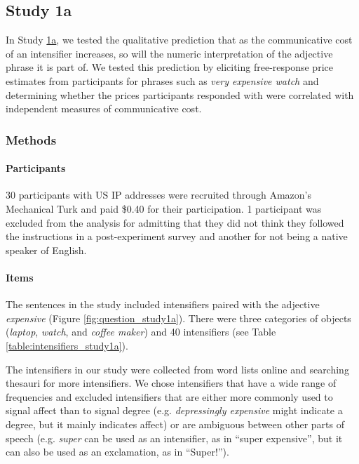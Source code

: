 \documentclass[10pt,letterpaper]{article}
\newcommand{\w}[1]{\emph{#1}}
\begin{document}
\subsection{Study 1a \label{sec:study1a}}

In Study \hyperref[sec:study1a]{1a}, we tested the qualitative prediction that as the communicative cost of an intensifier increases, so will the numeric interpretation of the adjective phrase it is part of.
We tested this prediction by eliciting free-response price estimates from participants for phrases such as \w{very expensive watch} and determining whether the prices participants responded with were correlated with independent measures of communicative cost.

\subsubsection{Methods}

\paragraph{Participants}

30 participants with US IP addresses were recruited through Amazon’s Mechanical Turk and paid \$0.40 for their participation. 1 participant was excluded from the analysis for admitting that they did not think they followed the instructions in a post-experiment survey and another for not being a native speaker of English.

\paragraph{Items}

The sentences in the study included intensifiers paired with the adjective \w{expensive} (Figure \ref{fig:question_study1a}).
There were three categories of objects (\w{laptop}, \w{watch}, and \w{coffee maker}) and 40 intensifiers (see Table \ref{table:intensifiers_study1a}).

The intensifiers in our study were collected from word lists online and searching thesauri for more intensifiers.
We chose intensifiers that have a wide range of frequencies and excluded intensifiers that are either more commonly used to signal affect than to signal degree (e.g. \w{depressingly expensive} might indicate a degree, but it mainly indicates affect) or are ambiguous between other parts of speech (e.g. \w{super} can be used as an intensifier, as in ``super expensive'', but it can also be used as an exclamation, as in ``Super!'').
\end{document}
